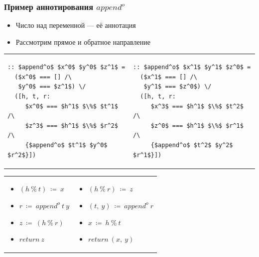 \documentclass{beamer}
\begin{document}
\begin{frame}[fragile]\frametitle{Пример аннотирования $append^o$}
\begin{itemize}
    \item Число над переменной --- её аннотация
    \item Рассмотрим прямое и обратное направление
\end{itemize}
\begin{tabular}{p{5.5cm} p{7cm}}
    \begin{center}
    \begin{lstlisting}
:: $append^o$ $x^0$ $y^0$ $z^1$ = 
  ($x^0$ === [] /\
   $y^0$ === $z^1$) \/
  ([h, t, r:
     $x^0$ === $h^1$ $\%$ $t^1$ /\
     $z^3$ === $h^1$ $\%$ $r^2$ /\
     {$append^o$ $t^1$ $y^0$ $r^2$}])
    \end{lstlisting}
    \end{center}
&
    \begin{center}
    \begin{lstlisting}
:: $append^o$ $x^1$ $y^1$ $z^0$ = 
  ($x^1$ === [] /\
   $y^1$ === $z^0$) \/
  ([h, t, r:
     $x^3$ === $h^1$ $\%$ $t^2$ /\
     $z^0$ === $h^1$ $\%$ $r^1$ /\
     {$append^o$ $t^2$ $y^2$ $r^1$}])
    \end{lstlisting}
    \end{center}
\end{tabular}
\begin{tabular}{p{5cm} p{5cm}}
    \begin{center}
        \begin{itemize}
            \item $(h~\%~t)~\coloneqq~x$
            \item $r~\coloneqq~append^o~t~y$
            \item $z~\coloneqq~(h~\%~r)$
            \item $return \ z$
        \end{itemize}
    \end{center}
&
    \begin{center}
        \begin{itemize}
            \item $(h~\%~r)~\coloneqq~z$
            \item $(t,~y)~\coloneqq~append^o~r$
            \item $x~\coloneqq~h~\%~t$
            \item $return \ (x, \ y)$
        \end{itemize}
    \end{center}
\end{tabular}
\end{frame}
\end{document}
